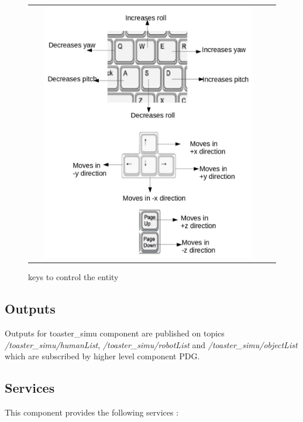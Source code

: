 \documentclass[a4paper]{article}
\begin{document}
\begin{figure}[ht!]
 \centering
 \begin{tabular}{cc}
  \includegraphics[width=0.9\textwidth]{img/directions.jpg}
 \end{tabular}
 \caption{keys to control the entity}
 \label{fig:directions}
 \end{figure}

\subsection{Outputs}
Outputs for toaster\_simu component are published on topics \textit{/toaster\_simu/humanList}, \textit{/toaster\_simu/robotList} and \textit{/toaster\_simu/objectList} which are subscribed by higher level component PDG.

\subsection{Services}
This component provides the following services :
\end{document}
